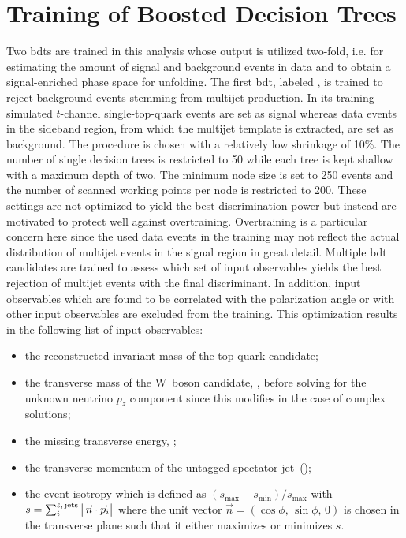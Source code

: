\section{Training of Boosted Decision Trees}
\label{sec:polarization-bdt-training}

Two \glspl{bdt} are trained in this analysis whose output is utilized two-fold, i.e. for estimating the amount of signal and background events in data and to obtain a signal-enriched phase space for unfolding. The first \gls{bdt}, labeled \bdtqcd, is trained to reject background events stemming from multijet production. In its training simulated $t$-channel single-top-quark events are set as signal whereas data events in the sideband region, from which the multijet template is extracted, are set as background. The \GRADIENTBOOST procedure is chosen with a relatively low shrinkage of 10\%. The number of single decision trees is restricted to 50 while each tree is kept shallow with a maximum depth of two. The minimum node size is set to 250 events and the number of scanned working points per node is restricted to 200. These settings are not optimized to yield the best discrimination power but instead are motivated to protect well against overtraining. Overtraining is a particular concern here since the used data events in the training may not reflect the actual distribution of multijet events in the signal region in great detail. Multiple \gls{bdt} candidates are trained to assess which set of input observables yields the best rejection of multijet events with the final discriminant. In addition, input observables which are found to be correlated with the polarization angle or with other input observables are excluded from the training. This optimization results in the following list of input observables:

\begin{itemize}
\item the reconstructed invariant mass of the top quark candidate;
\item the transverse mass of the W~boson candidate, \mtw, before solving for the unknown neutrino $p_{z}$ component since this modifies \pvmiss in the case of complex solutions;
\item the missing transverse energy, \met;
\item the transverse momentum of the untagged spectator jet~(\jprime);
\item the event isotropy which is defined as $(s_\mathrm{max}-s_\mathrm{min})/s_\mathrm{max}$ with $s=\sum_{i}^\scriptn{\ell,\,\mathrm{jets}}\big|\,\vec{n}\cdot\vec{p}_{i}\big|$ where the unit vector $\vec{n}=(\cos\phi,\,\sin\phi,\,0)$ is chosen in the transverse plane such that it either maximizes or minimizes $s$.
\end{itemize}

